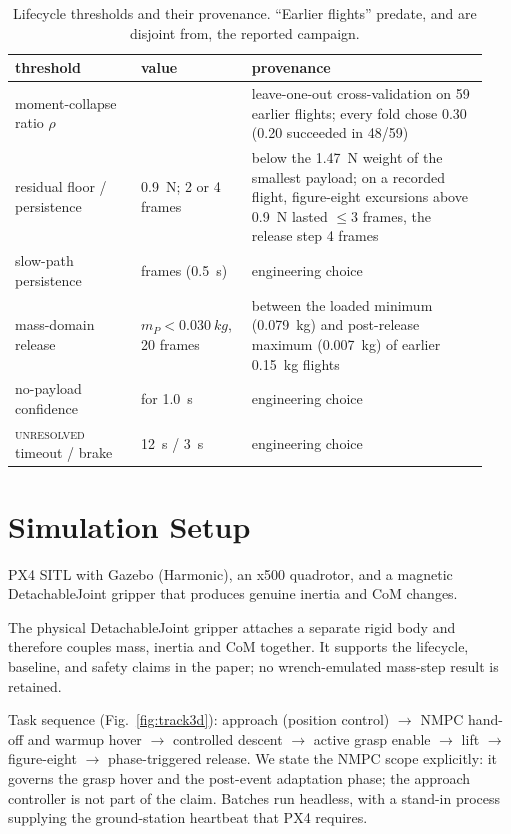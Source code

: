 \documentclass[conference]{IEEEtran}
\begin{document}
\begin{table}[tb]
\caption{Lifecycle thresholds and their provenance. ``Earlier flights'' predate, and are
disjoint from, the reported campaign.}
\label{tab:thresholds}
\centering
\scriptsize
\setlength{\tabcolsep}{3pt}
\begin{tabular}{@{}>{\raggedright\arraybackslash}p{0.25\linewidth}>{\raggedright\arraybackslash}p{0.22\linewidth}>{\raggedright\arraybackslash}p{0.47\linewidth}@{}}
\toprule
threshold & value & provenance \\
\midrule
moment-collapse ratio $\rho$ & 0.30 & leave-one-out cross-validation on 59 earlier flights; every fold chose 0.30 (0.20 succeeded in 48/59) \\
residual floor / persistence & \SI{0.9}{N}; 2 or 4 frames & below the \SI{1.47}{N} weight of the smallest payload; on a recorded flight, figure-eight excursions above \SI{0.9}{N} lasted $\le3$ frames, the release step 4 frames \\
slow-path persistence & 5 frames (\SI{0.5}{s}) & engineering choice \\
mass-domain release & $m_P<\SI{0.030}{kg}$, 20 frames & between the loaded minimum (\SI{0.079}{kg}) and post-release maximum (\SI{0.007}{kg}) of earlier \SI{0.15}{kg} flights \\
no-payload confidence & 0.90 for \SI{1.0}{s} & engineering choice \\
\textsc{unresolved} timeout / brake & \SI{12}{s} / \SI{3}{s} & engineering choice \\
\bottomrule
\end{tabular}
\end{table}

\section{Simulation Setup}\label{sec:sim}
PX4 SITL with Gazebo \cite{gazebo} (Harmonic), an x500 quadrotor, and a magnetic DetachableJoint gripper
that produces genuine inertia and CoM changes.

The physical DetachableJoint gripper attaches a separate rigid body and therefore couples
mass, inertia and CoM together. It supports the lifecycle, baseline, and safety claims in the
paper; no wrench-emulated mass-step result is retained.

Task sequence (Fig.~\ref{fig:track3d}): approach (position control)
$\rightarrow$ NMPC hand-off and warmup hover $\rightarrow$ controlled descent $\rightarrow$
active grasp enable $\rightarrow$ lift $\rightarrow$ figure-eight $\rightarrow$
phase-triggered release. We state the NMPC scope explicitly: it governs the grasp hover and
the post-event adaptation phase; the approach controller is not part of the claim.
Batches run headless, with a stand-in process supplying the ground-station heartbeat that PX4
requires.
\end{document}
